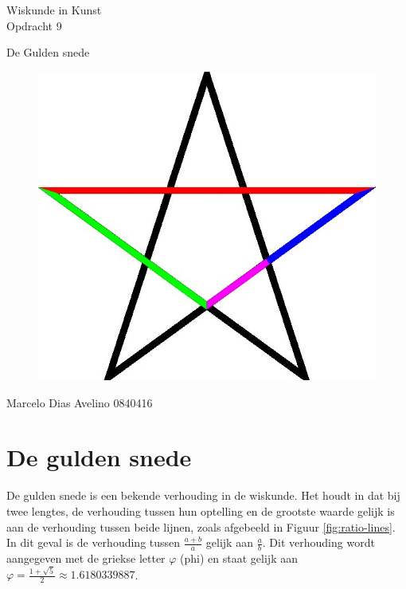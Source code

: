 \documentclass{article}
\begin{document}
\begin{center}
	\huge{Wiskunde in Kunst}\\
	\LARGE{Opdracht 9} \\
	
	\vspace{2cm}
	
	\Large{De Gulden snede}\\
	
	\vfill
	
	\begin{figure}[Hh]
		\centering
		\includegraphics[width=\textwidth]{Pentagram-phi.jpg}
	\end{figure}
	
	\vfill
	\Large{Marcelo Dias Avelino} \hfill \large{0840416}
\end{center}

\thispagestyle{empty} %

\pagebreak

\setcounter{page}{1} %

\section{De gulden snede}

De gulden snede is een bekende verhouding in de wiskunde. Het houdt in dat bij twee lengtes, de verhouding tussen hun optelling en de grootste waarde gelijk is aan de verhouding tussen beide lijnen, zoals afgebeeld in Figuur \ref{fig:ratio-lines}. In dit geval is de verhouding tussen \( \frac{a+b}{a} \) gelijk aan \( \frac{a}{b} \). Dit verhouding wordt aangegeven met de griekse letter \(\varphi\) (phi) en staat gelijk aan \(\varphi = \frac{1+\sqrt{5}}{2} \approx 1.6180339887\). 
\end{document}
